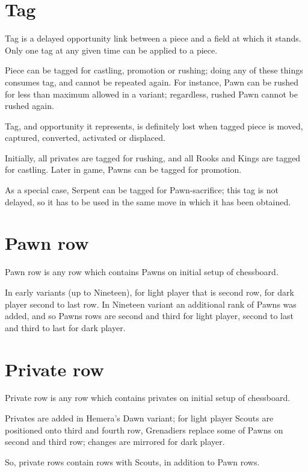 \section*{Tag}
\label{sec:Terms/Tag}
Tag is a delayed opportunity link between a piece and a field at which it stands.
Only one tag at any given time can be applied to a piece.

Piece can be tagged for castling, promotion or rushing; doing any of these things
consumes tag, and cannot be repeated again. For instance, Pawn can be rushed for
less than maximum allowed in a variant; regardless, rushed Pawn cannot be rushed
again.

Tag, and opportunity it represents, is definitely lost when tagged piece is moved,
captured, converted, activated or displaced.

Initially, all privates are tagged for rushing, and all Rooks and Kings are tagged
for castling. Later in game, Pawns can be tagged for promotion.

As a special case, Serpent can be tagged for Pawn-sacrifice; this tag is not
delayed, so it has to be used in the same move in which it has been obtained.

\section*{Pawn row}
\label{sec:Terms/Pawn row}
Pawn row is any row which contains Pawns on initial setup of chessboard.

In early variants (up to Nineteen), for light player that is second row, for
dark player second to last row. In Nineteen variant an additional rank of
Pawns was added, and so Pawns rows are second and third for light player,
second to last and third to last for dark player.

\section*{Private row}
\label{sec:Terms/Private row}
Private row is any row which contains privates on initial setup of chessboard.

Privates are added in Hemera's Dawn variant; for light player Scouts are positioned
onto third and fourth row, Grenadiers replace some of Pawns on second and third row;
changes are mirrored for dark player.

So, private rows contain rows with Scouts, in addition to Pawn rows.

